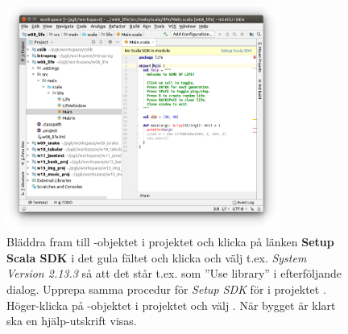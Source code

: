 \begin{figure}
\centering
\includegraphics[width=0.8\textwidth]{../img/intellij/import78-setup-scala-sdk.png}

\caption{Bläddra fram till -objektet i projektet  och klicka på länken \textbf{Setup Scala SDK} i det gula fältet och klicka  och välj t.ex. \emph{System Version 2.13.3} så att det står t.ex.  som ''Use library'' i efterföljande dialog. Upprepa samma procedur för \emph{Setup SDK} för  i projektet . Höger-klicka på -objektet i projektet  och välj . När bygget är klart ska en hjälp-utskrift visas.}
\label{fig:idea:import78-setup-scala-sdk}
\end{figure}


%
%
%
